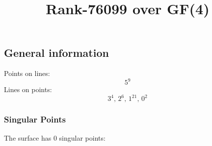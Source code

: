 \documentclass{article}
\newcommand\setTBstruts{\def\T{\rule{0pt}{2.6ex}}%
\def\B{\rule[-1.2ex]{0pt}{0pt}}}
\begin{document}
 
\setTBstruts



{\allowdisplaybreaks%






\title{Rank-76099 over GF(4)}
\author{}%
\maketitle%
%
{}



\subsection*{General information}
Points on lines:
$$
5^9$$
Lines on points:
$$
3^4,\,2^6,\,1^{21},\,0^2$$
\subsubsection*{Singular Points}
The surface has 0 singular points:\\
\begin{align*}
\end{align*}
}
\end{document}
